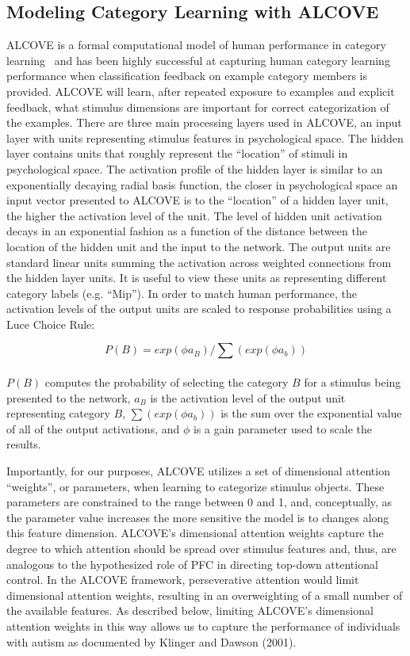 \subsection{Modeling Category Learning with ALCOVE}
ALCOVE is a formal computational model of human performance in category learning~\cite{RefWorks:114} and has been highly successful at capturing human category learning performance when classification feedback on example category members is provided.  ALCOVE will learn, after repeated exposure to examples and explicit feedback, what stimulus dimensions are important for correct categorization of the examples.  There are three main processing layers used in ALCOVE, an input layer with units representing stimulus features in psychological space.  The hidden layer contains units that roughly represent the ``location'' of stimuli in psychological space.  The activation profile of the hidden layer is similar to an exponentially decaying radial basis function, the closer in psychological space an input vector presented to ALCOVE is to the ``location'' of a hidden layer unit, the higher the activation level of the unit.  The level of hidden unit activation decays in an exponential fashion as a function of the distance between the location of the hidden unit and the input to the network.  The output units are standard linear units summing the activation across weighted connections from the hidden layer units.  It is useful to view these units as representing different category labels (e.g. ``Mip''). In order to match human performance, the activation levels of the output units are scaled to response probabilities using a Luce Choice Rule:

\begin{equation}
P(B) = exp(\phi a_B) / \sum (exp(\phi a_b))
\label{luce-choice}
\end{equation}\\
$P(B)$ computes the probability of selecting the category $B$ for a stimulus being presented to the network, $a_B$ is the activation level of the output unit representing category $B$, $\sum (exp(\phi a_b))$ is the sum over the exponential value of all of the output activations, and  $\phi$ is a gain parameter used to scale the results.

Importantly, for our purposes, ALCOVE utilizes a set of dimensional attention ``weights'', or parameters, when learning to categorize stimulus objects.  These parameters are constrained to the range between 0 and 1, and, conceptually, as the parameter value increases the more sensitive the model is to changes along this feature dimension.  ALCOVE's dimensional attention weights capture the degree to which attention should be spread over stimulus features and, thus, are analogous to the hypothesized role of PFC in directing top-down attentional control.  In the ALCOVE framework, perseverative attention would limit dimensional attention weights, resulting in an overweighting of a small number of the available features.  As described below, limiting ALCOVE's dimensional attention weights in this way allows us to capture the performance of individuals with autism as documented by Klinger and Dawson (2001). 

